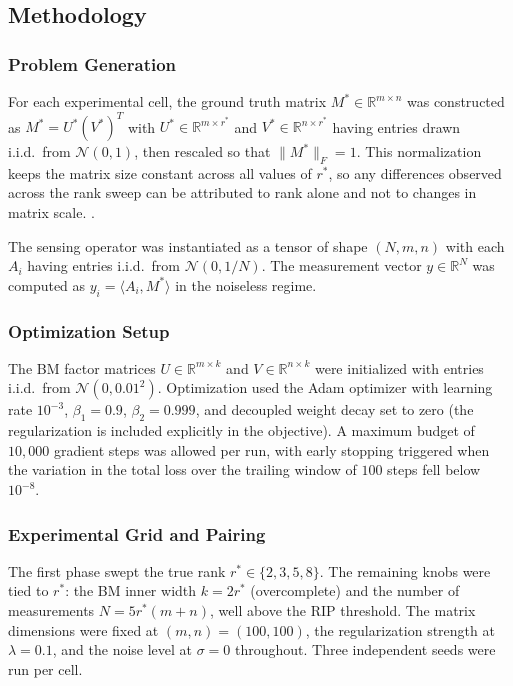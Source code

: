 \subsection{Methodology}

\subsubsection{Problem Generation}
For each experimental cell, the ground truth matrix $M^* \in \mathbb{R}^{m \times n}$ was constructed as $M^* = U^* (V^*)^T$ with $U^* \in \mathbb{R}^{m \times r^*}$ and $V^* \in \mathbb{R}^{n \times r^*}$ having entries drawn i.i.d.\ from $\mathcal{N}(0, 1)$, then rescaled so that $\|M^*\|_F = 1$. This normalization keeps the matrix size constant across all values of $r^*$, so any differences observed across the rank sweep can be attributed to rank alone and not to changes in matrix scale. .

The sensing operator was instantiated as a tensor of shape $(N, m, n)$ with each $A_i$ having entries i.i.d.\ from $\mathcal{N}(0, 1/N)$. The measurement vector $y \in \mathbb{R}^N$ was computed as $y_i = \langle A_i, M^* \rangle$ in the noiseless regime.

\subsubsection{Optimization Setup}
The BM factor matrices $U \in \mathbb{R}^{m \times k}$ and $V \in \mathbb{R}^{n \times k}$ were initialized with entries i.i.d.\ from $\mathcal{N}(0, 0.01^2)$. Optimization used the Adam optimizer with learning rate $10^{-3}$, $\beta_1 = 0.9$, $\beta_2 = 0.999$, and decoupled weight decay set to zero (the regularization is included explicitly in the objective). A maximum budget of $10{,}000$ gradient steps was allowed per run, with early stopping triggered when the variation in the total loss over the trailing window of $100$ steps fell below $10^{-8}$.


\subsubsection{Experimental Grid and Pairing}
The first phase swept the true rank $r^* \in \{2, 3, 5, 8\}$. The remaining knobs were tied to $r^*$: the BM inner width $k = 2r^*$ (overcomplete) and the number of measurements $N = 5 r^* (m + n)$, well above the RIP threshold. The matrix dimensions were fixed at $(m, n) = (100, 100)$, the regularization strength at $\lambda = 0.1$, and the noise level at $\sigma = 0$ throughout. Three independent seeds were run per cell.

